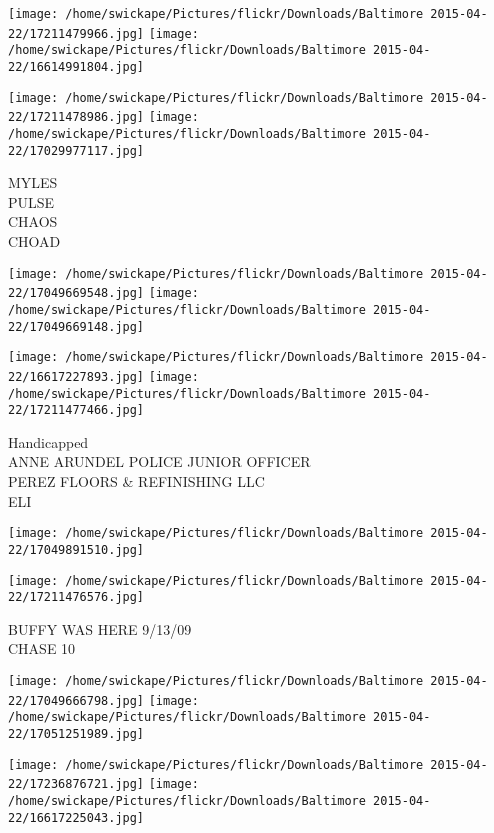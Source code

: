 \documentclass[10pt,letterpaper]{article}
\begin{document}
\texttt{[image: /home/swickape/Pictures/flickr/Downloads/Baltimore 2015-04-22/17211479966.jpg]}
\texttt{[image: /home/swickape/Pictures/flickr/Downloads/Baltimore 2015-04-22/16614991804.jpg]}

\texttt{[image: /home/swickape/Pictures/flickr/Downloads/Baltimore 2015-04-22/17211478986.jpg]}
\texttt{[image: /home/swickape/Pictures/flickr/Downloads/Baltimore 2015-04-22/17029977117.jpg]}

MYLES\\
PULSE\\
CHAOS\\
CHOAD\\
\pagebreak

\texttt{[image: /home/swickape/Pictures/flickr/Downloads/Baltimore 2015-04-22/17049669548.jpg]}
\texttt{[image: /home/swickape/Pictures/flickr/Downloads/Baltimore 2015-04-22/17049669148.jpg]}

\texttt{[image: /home/swickape/Pictures/flickr/Downloads/Baltimore 2015-04-22/16617227893.jpg]}
\texttt{[image: /home/swickape/Pictures/flickr/Downloads/Baltimore 2015-04-22/17211477466.jpg]}

Handicapped\\
ANNE ARUNDEL POLICE JUNIOR OFFICER\\
PEREZ FLOORS \& REFINISHING LLC\\
ELI\\
\pagebreak

\texttt{[image: /home/swickape/Pictures/flickr/Downloads/Baltimore 2015-04-22/17049891510.jpg]}

\vspace{0.25in}
\texttt{[image: /home/swickape/Pictures/flickr/Downloads/Baltimore 2015-04-22/17211476576.jpg]}

BUFFY WAS HERE 9/13/09\\
CHASE 10\\
\pagebreak

\texttt{[image: /home/swickape/Pictures/flickr/Downloads/Baltimore 2015-04-22/17049666798.jpg]}
\texttt{[image: /home/swickape/Pictures/flickr/Downloads/Baltimore 2015-04-22/17051251989.jpg]}

\texttt{[image: /home/swickape/Pictures/flickr/Downloads/Baltimore 2015-04-22/17236876721.jpg]}
\texttt{[image: /home/swickape/Pictures/flickr/Downloads/Baltimore 2015-04-22/16617225043.jpg]}
\end{document}
